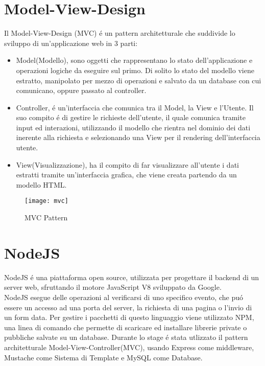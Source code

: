 \section{Model-View-Design}
Il Model-View-Design (MVC) \'e un pattern architetturale che suddivide lo sviluppo di un'applicazione web in 3 parti:
\begin{itemize}
\item Model(Modello), sono oggetti che rappresentano lo stato dell'applicazione e operazioni logiche da eseguire sul primo. Di solito
lo stato del modello viene estratto, manipolato per mezzo di operazioni e salvato da un database con cui comunicano,
oppure passato al controller.
\item Controller, \'e un'interfaccia che comunica tra il Model, la View e l'Utente. Il suo compito \'e di gestire le richieste dell'utente,
il quale comunica tramite input ed interazioni, utilizzando il modello che rientra nel dominio
dei dati inerente alla richiesta e selezionando una View per il rendering dell'interfaccia utente.
\item View(Visualizzazione), ha il compito di far visualizzare all'utente i dati estratti tramite un'interfaccia grafica, che viene creata
partendo da un modello HTML.\\[2\baselineskip]
\end{itemize}
\begin{figure}[H]
    \texttt{[image: mvc]}
    \caption{MVC Pattern}
\end{figure}

\section{NodeJS}
NodeJS \'e una piattaforma open source, utilizzata per progettare il backend di un server web, sfruttando
il motore JavaScript V8 sviluppato da Google.\\
NodeJS esegue delle operazioni al verificarsi di uno specifico evento, che pu\'o essere un accesso ad una porta
del server, la richiesta di una pagina o l'invio di un form data.
Per gestire i pacchetti di questo linguaggio viene utilizzato NPM\cite{NPM}, una linea di comando che permette
di scaricare ed installare librerie private o pubbliche salvate su un database.
Durante lo stage \'e stata utlizzato il pattern architetturale Model-View-Controller(MVC), usando Express
come middleware, Mustache come Sistema di Template e MySQL come Database.
\\[1\baselineskip]

